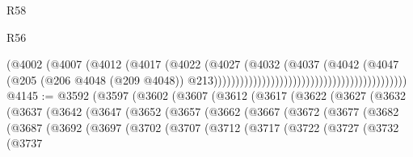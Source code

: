 \begin{lexlean}{R58}
\begin{lexlean}{R56}
\begin{coremodule}
{{{{{{{{{{{{{{{{{{{{{{{{{{{{{{{{{{{{{{{{{{{{{{{{{{{{{{{{{{{{{{{{{{{{{{{{{{{{{{{{{{{{{{{{{{{{{{{{{{{{{{{{{{{{{{{{{{{{{{{{{{{{{{{{{{{{{{{{{{{{{{{{{{{{{{{{{{{{{{{{{{{{{{{{{{{{{{{{{{{{{{{{{{{{{{{{{{{{{{{{{{{{{{{{{{{                                                                      (@4002
                                                                        (@4007
                                                                          (@4012
                                                                            (@4017
                                                                              (@4022
                                                                                (@4027
                                                                                  (@4032
                                                                                    (@4037
                                                                                      (@4042
                                                                                        (@4047
                                                                                          (@205
                                                                                            (@206
                                                                                              @4048
                                                                                              (@209
                                                                                                @4048))
                                                                                            @213))))))))))))))))))))))))))))))))))))))))))))
@4145 := @3592
    (@3597
      (@3602
        (@3607
          (@3612
            (@3617
              (@3622
                (@3627
                  (@3632
                    (@3637
                      (@3642
                        (@3647
                          (@3652
                            (@3657
                              (@3662
                                (@3667
                                  (@3672
                                    (@3677
                                      (@3682
                                        (@3687
                                          (@3692
                                            (@3697
                                              (@3702
                                                (@3707
                                                  (@3712
                                                    (@3717
                                                      (@3722
                                                        (@3727
                                                          (@3732
                                                            (@3737
}}}}}}}}}}}}}}}}}}}}}}}}}}}}}}}}}}}}}}}}}}}}}}}}}}}}}}}}}}}}}}}}}}}}}}}}}}}}}}}}}}}}}}}}}}}}}}}}}}}}}}}}}}}}}}}}}}}}}}}}}}}}}}}}}}}}}}}}}}}}}}}}}}}}}}}}}}}}}}}}}}}}}}}}}}}}}}}}}}}}}}}}}}}}}}}}}}}}}}}}}}}}}}}}}}}
\end{coremodule}
\end{lexlean}
\end{lexlean}
